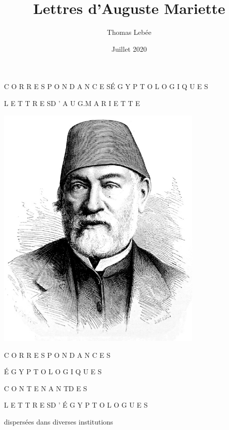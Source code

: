 \documentclass{book}
\title{Lettres d’Auguste Mariette}
\author{Thomas Lebée}
\date{Juillet 2020}
\begin{document}
\begin{titlepage}
\frontmatter
\centering
\hspace{0pt}
\vfill
\large
C O R R E S P O N D A N C E S\space\space\space É G Y P T O L O G I Q U E S \vspace{3\baselineskip}

\Large L E T T R E S\space\space\space D ’ A U G.\space\space\space M A R I E T T E
\vspace{15\baselineskip}
\vfill
\hspace{0pt}

\pagebreak
\thispagestyle{empty}
\hspace{0pt}
\vfill
\includegraphics[height=12cm]{CoEg_Mariette_portrait.jpg}
\vfill
\hspace{0pt}

\pagebreak
\thispagestyle{empty}

\LARGE{C O R R E S P O N D A N C E S}
    
\Huge{É G Y P T O L O G I Q U E S}
\vspace{1\baselineskip}

\large C O N T E N A N T\space\space\space D E S
\vspace{1\baselineskip}

\Large L E T T R E S\space\space\space D ’ É G Y P T O L O G U E S
\vspace{2\baselineskip}

\large dispersées dans diverses institutions
\vspace{1\baselineskip}


\end{titlepage}
\end{document}
